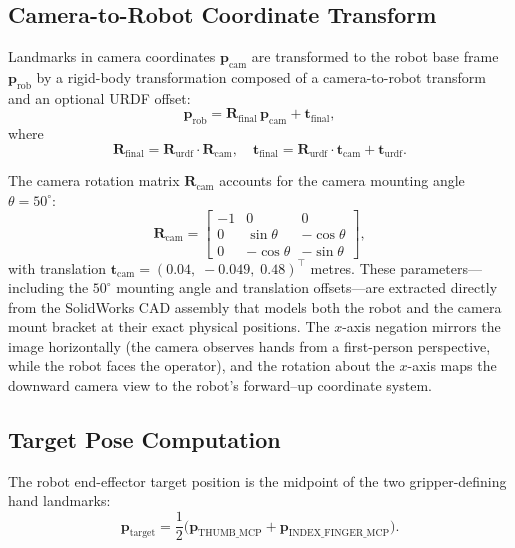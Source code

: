 \documentclass[10pt,journal]{IEEEtran}
\newcommand{\vect}[1]{\mathbf{#1}}
\newcommand{\mat}[1]{\mathbf{#1}}
\begin{document}
\subsection{Camera-to-Robot Coordinate Transform}
\label{sec:transform}

Landmarks in camera coordinates $\vect{p}_{\text{cam}}$ are transformed
to the robot base frame $\vect{p}_{\text{rob}}$ by a rigid-body
transformation composed of a camera-to-robot transform and an optional
URDF offset:
\begin{equation}\label{eq:transform}
  \vect{p}_{\text{rob}} = \mat{R}_{\text{final}}\,\vect{p}_{\text{cam}}
                          + \vect{t}_{\text{final}},
\end{equation}
where
\begin{equation}
  \mat{R}_{\text{final}} = \mat{R}_{\text{urdf}} \cdot \mat{R}_{\text{cam}},
  \quad
  \vect{t}_{\text{final}} = \mat{R}_{\text{urdf}} \cdot \vect{t}_{\text{cam}}
                             + \vect{t}_{\text{urdf}}.
\end{equation}

The camera rotation matrix $\mat{R}_{\text{cam}}$ accounts for the
camera mounting angle $\theta = 50^{\circ}$:
\begin{equation}\label{eq:Rcam}
  \mat{R}_{\text{cam}} =
  \begin{bmatrix}
    -1 & 0 & 0 \\
    0 & \sin\theta & -\cos\theta \\
    0 & -\cos\theta & -\sin\theta
  \end{bmatrix},
\end{equation}
with translation $\vect{t}_{\text{cam}} = (0.04,\; -0.049,\; 0.48)^\top$
metres. These parameters---including the $50^{\circ}$ mounting angle and
translation offsets---are extracted directly from the SolidWorks CAD
assembly that models both the robot and the camera mount bracket at
their exact physical positions.
The $x$-axis negation mirrors the image horizontally (the camera
observes hands from a first-person perspective, while the robot faces
the operator), and the rotation about the $x$-axis maps the downward
camera view to the robot's forward--up coordinate system.

\subsection{Target Pose Computation}
\label{sec:targetpose}

The robot end-effector target position is the midpoint of the two
gripper-defining hand landmarks:
\begin{equation}\label{eq:targetpos}
  \vect{p}_{\text{target}} = \frac{1}{2}
    \bigl(\vect{p}_{\text{THUMB\_MCP}} +
    \vect{p}_{\text{INDEX\_FINGER\_MCP}}\bigr).
\end{equation}
\end{document}
